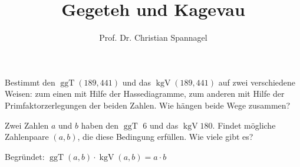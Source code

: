 \documentclass{cssheet}
\title{Gegeteh und Kagevau}
\author{Prof. Dr. Christian Spannagel}
\begin{document}
\printtitle 

\vspace*{10mm}

\begin{aufgabe}
	Bestimmt den $\operatorname{ggT} (189,441)$ und das $\operatorname{kgV}  (189,441)$ auf zwei verschiedene Weisen: zum einen mit Hilfe der Hassediagramme, zum anderen mit Hilfe der Primfaktorzerlegungen der beiden Zahlen. Wie hängen beide Wege zusammen?
\end{aufgabe}

\begin{aufgabe}
	Zwei Zahlen $a$ und $b$ haben den $\operatorname{ggT}$ $6$ und das $\operatorname{kgV} 180$. Findet mögliche Zahlenpaare $(a,b)$, die diese Bedingung erfüllen. Wie viele gibt es?
\end{aufgabe}

\begin{aufgabe}
	Begründet: $\operatorname{ggT} (a,b)\cdot \operatorname{kgV} (a,b) = a\cdot b$
	\end{aufgabe}


\vspace*{10mm}
\printlicense

\printsocials
\end{document}
